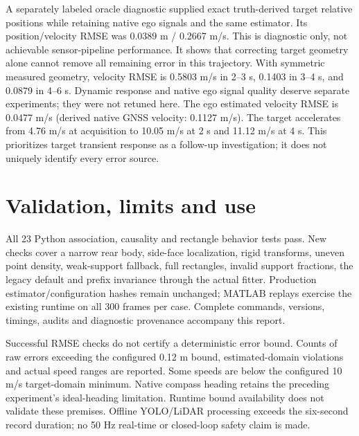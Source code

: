 \documentclass[11pt]{article}
\begin{document}
A separately labeled oracle diagnostic supplied exact truth-derived target
relative positions while retaining native ego signals and the same estimator.
Its position/velocity RMSE was 0.0389 m / 0.2667 m/s. This is diagnostic only,
not achievable sensor-pipeline performance. It shows that correcting target
geometry alone cannot remove all remaining error in this trajectory.
With symmetric measured geometry, velocity RMSE is 0.5803 m/s in 2--3 s,
0.1403 in 3--4 s, and 0.0879 in 4--6 s. Dynamic response and native ego signal
quality deserve separate experiments; they were not retuned here. The ego
estimated velocity RMSE is 0.0477 m/s (derived native GNSS velocity: 0.1127
m/s). The target accelerates from 4.76 m/s at acquisition to 10.05 m/s at
2 s and 11.12 m/s at 4 s. This prioritizes target transient response as a
follow-up investigation; it does not uniquely identify every error source.

\section{Validation, limits and use}
All 23 Python association, causality and rectangle behavior tests pass. New
checks cover a narrow rear body, side-face localization, rigid transforms,
uneven point density, weak-support fallback, full rectangles, invalid support
fractions, the legacy default and prefix invariance through the actual fitter.
Production estimator/configuration hashes remain unchanged; MATLAB replays
exercise the existing runtime on all 300 frames per case. Complete commands,
versions, timings, audits and diagnostic provenance accompany this report.

Successful RMSE checks do not certify a deterministic error bound. Counts of
raw errors exceeding the configured 0.12 m bound, estimated-domain violations
and actual speed ranges are reported. Some speeds are below the configured
10 m/s target-domain minimum. Native compass heading retains the preceding
experiment's ideal-heading limitation. Runtime bound availability does not
validate these premises. Offline YOLO/LiDAR processing exceeds the six-second
record duration; no 50 Hz real-time or closed-loop safety claim is made.
\end{document}
